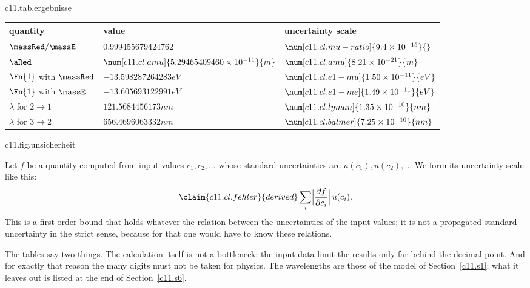 \begin{vertiefung}
  \begin{tpctable}{c11.tab.ergebnisse}
    \caption{Results of the model for $\Znuc = 1$ and the scale of their uncertainty
      according to \eqref{c11.eq.fehler}, rounded up.}
    \begin{tabular}{lll}
      \toprule
      quantity & value & uncertainty scale \\
      \midrule
      $\massRed/\massE$ & $\num[c11.cl.mu-ratio]{0.999455679424762}{}$
        & $\num[c11.cl.mu-ratio]{9.4 \times 10^{-15}}{}$ \\
      $\aRed$ & $\num[c11.cl.amu]{5.29465409460 \times 10^{-11}}{m}$
        & $\num[c11.cl.amu]{8.21 \times 10^{-21}}{m}$ \\
      $\En{1}$ with $\massRed$ & $\num[c11.cl.e1-mu]{-13.598287264283}{eV}$
        & $\num[c11.cl.e1-mu]{1.50 \times 10^{-11}}{eV}$ \\
      $\En{1}$ with $\massE$ & $\num[c11.cl.e1-me]{-13.605693122991}{eV}$
        & $\num[c11.cl.e1-me]{1.49 \times 10^{-11}}{eV}$ \\
      $\lambda$ for $2 \to 1$ & $\num[c11.cl.lyman]{121.5684456173}{nm}$
        & $\num[c11.cl.lyman]{1.35 \times 10^{-10}}{nm}$ \\
      $\lambda$ for $3 \to 2$ & $\num[c11.cl.balmer]{656.4696063332}{nm}$
        & $\num[c11.cl.balmer]{7.25 \times 10^{-10}}{nm}$ \\
      \bottomrule
    \end{tabular}
  \end{tpctable}

  \begin{tpcfigure}{c11.fig.unsicherheit}
    \caption{The uncertainty of each row of Tables~\ref{c11.tab.codata} and \ref{c11.tab.ergebnisse}, divided by the modulus of the value, on a logarithmic axis. Solid the input data, dashed the results. The least accurate are the lengths $\aBohr$ and $\aRed$; the energies and wavelengths inherit the accuracy of the Rydberg constant.}
  \end{tpcfigure}

  Let $f$ be a quantity computed from input values $c_1, c_2, \ldots$ whose standard
  uncertainties are $u(c_1), u(c_2), \ldots$ We form its uncertainty scale like this:
  \begin{equation}\label{c11.eq.fehler}\claim{c11.cl.fehler}{derived}
    \sum_i \Bigl\lvert \frac{\partial f}{\partial c_i} \Bigr\rvert\, u(c_i) .
  \end{equation}
  This is a first-order bound that holds whatever the relation between the uncertainties
  of the input values; it is not a propagated standard uncertainty in the strict sense,
  because for that one would have to know these relations.

  The tables say two things. The calculation itself is not a bottleneck: the input data
  limit the results only far behind the decimal point. And for exactly that reason the
  many digits must not be taken for physics. The wavelengths are those of the model of
  Section~\ref{c11.s1}; what it leaves out is listed at the end of Section~\ref{c11.s6}.
\end{vertiefung}

